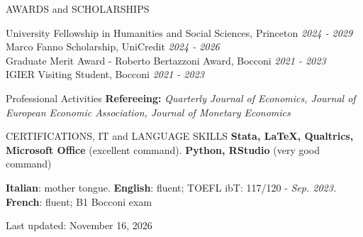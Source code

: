 \documentclass{resume} %
\begin{document}
\vspace{0.1cm}
	
		\begin{rSection}{AWARDS and SCHOLARSHIPS}

		University Fellowship in Humanities and Social Sciences, Princeton \hfill \textit{2024 - 2029} \\
		Marco Fanno Scholarship, UniCredit  \hfill \textit{2024 - 2026} \\
		Graduate Merit Award - Roberto Bertazzoni Award, Bocconi \hfill \textit{2021 - 2023}\\ 
		IGIER Visiting Student, Bocconi  \hfill \textit{2021 - 2023}
		
		
	\end{rSection}

	\vspace{-0.2cm}
	\begin{rSection}{Professional Activities}
		\textbf{Refereeing:} \textit{Quarterly Journal of Economics, Journal of European Economic Association, Journal of Monetary Economics}
		\vspace{-0.1cm}

	\end{rSection}

	\begin{rSection}{CERTIFICATIONS, IT and LANGUAGE SKILLS}
		\textbf{Stata, \LaTeX, Qualtrics, Microsoft Office} (excellent command). \textbf{Python, RStudio} (very good command)
		
		
		\textbf{Italian}: mother tongue.
		\textbf{English}: fluent; TOEFL ibT: 117/120 - \textit{Sep. 2023.}
		\textbf{French}: fluent;  B1 Bocconi exam
	\end{rSection}


{\footnotesize Last updated: November 16, 2026}
	
\end{document}
